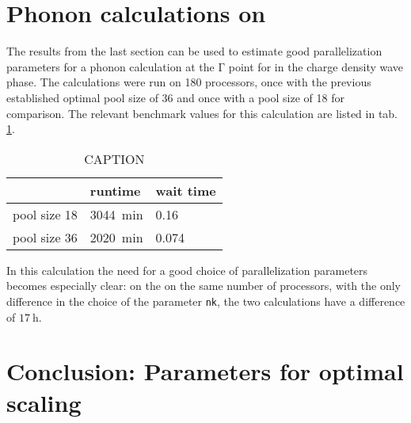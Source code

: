 \documentclass[main.tex]{subfiles}
\begin{document}
\section{Phonon calculations on \TaS}

The results from the last section can be used to estimate good parallelization parameters for a phonon calculation at the \(\mathrm{\Gamma}\) point for \TaS in the charge density wave phase.
The calculations were run on 180 processors, once with the previous established optimal pool size of 36 and once with a pool size of 18 for comparison.
The relevant benchmark values for this calculation are listed in tab. \ref{tab:tas2_cdw_phonon_times}.

\begin{table}[ht!]
    \caption{CAPTION}
    \begin{tabular}{@{}lll@{}}
    \toprule
                 & runtime            & wait time \\ \midrule
    pool size 18 & \SI{3044}{\minute} & 0.16         \\
    pool size 36 & \SI{2020}{\minute} & 0.074
    \end{tabular}
    \label{tab:tas2_cdw_phonon_times}
\end{table}
In this calculation the need for a good choice of parallelization parameters becomes especially clear:
on the on the same number of processors, with the only difference in the choice of the parameter \texttt{nk}, the two calculations have a difference of \(\SI{17}{\hour}\).

\section{Conclusion: Parameters for optimal scaling}
\end{document}
